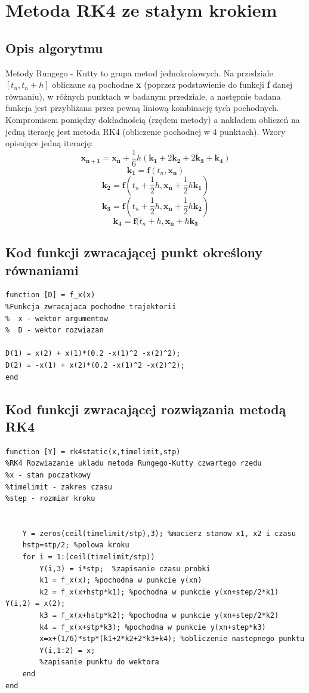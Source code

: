 \documentclass[a4paper, 11pt]{article}
\begin{document}
\section{Metoda RK4 ze stałym krokiem}

\subsection{Opis algorytmu}
Metody Rungego - Kutty to grupa metod jednokrokowych. Na przedziale $[t_{n}, t_{n} + h]$ obliczane są pochodne \textbf{x} (poprzez podstawienie do funkcji \textbf{f} danej równaniu), w różnych punktach w badanym przedziale, a następnie badana funkcja jest przybliżana przez pewną liniową kombinację tych pochodnych. Kompromisem pomiędzy dokładnością (rzędem metody) a nakładem obliczeń na jedną iterację jest metoda RK4 (obliczenie pochodnej w 4 punktach). Wzory opisujące jedną iterację:
$$ \mathbf{x_{n+1}} = \mathbf{x_{n}} + \frac{1}{6}h(\mathbf{k_{1}} + 2\mathbf{k_{2}} + 2\mathbf{k_{3}} + \mathbf{k_{4}})$$
$$\mathbf{k_{1}} = \mathbf{f}(t_{n}, \mathbf{x_{n}})$$
$$\mathbf{k_{2}} = \mathbf{f}(t_{n}+\frac{1}{2}h, \mathbf{x_{n}} + \frac{1}{2}h\mathbf{k_{1}})$$
$$\mathbf{k_{3}} = \mathbf{f}(t_{n}+\frac{1}{2}h, \mathbf{x_{n}} + \frac{1}{2}h\mathbf{k_{2}})$$
$$\mathbf{k_{4}} = \mathbf{f}(t_{n}+h, \mathbf{x_{n}} + h\mathbf{k_{3}}$$

\subsection{Kod funkcji zwracającej punkt określony równaniami}
\begin{lstlisting}
function [D] = f_x(x)
%Funkcja zwracajaca pochodne trajektorii 
%  x - wektor argumentow 
%  D - wektor rozwiazan

D(1) = x(2) + x(1)*(0.2 -x(1)^2 -x(2)^2); 
D(2) = -x(1) + x(2)*(0.2 -x(1)^2 -x(2)^2);
end
\end{lstlisting}

\subsection{Kod funkcji zwracającej rozwiązania metodą RK4}
\begin{lstlisting}
function [Y] = rk4static(x,timelimit,stp)
%RK4 Rozwiazanie ukladu metoda Rungego-Kutty czwartego rzedu
%x - stan poczatkowy
%timelimit - zakres czasu
%step - rozmiar kroku


    Y = zeros(ceil(timelimit/stp),3); %macierz stanow x1, x2 i czasu
    hstp=stp/2; %polowa kroku
    for i = 1:(ceil(timelimit/stp))
        Y(i,3) = i*stp;  %zapisanie czasu probki
        k1 = f_x(x); %pochodna w punkcie y(xn)
        k2 = f_x(x+hstp*k1); %pochodna w punkcie y(xn+step/2*k1)        Y(i,2) = x(2);
        k3 = f_x(x+hstp*k2); %pochodna w punkcie y(xn+step/2*k2)
        k4 = f_x(x+stp*k3); %pochodna w punkcie y(xn+step*k3)
        x=x+(1/6)*stp*(k1+2*k2+2*k3+k4); %obliczenie nastepnego punktu
        Y(i,1:2) = x;  
        %zapisanie punktu do wektora
    end
end
\end{lstlisting}
\end{document}
